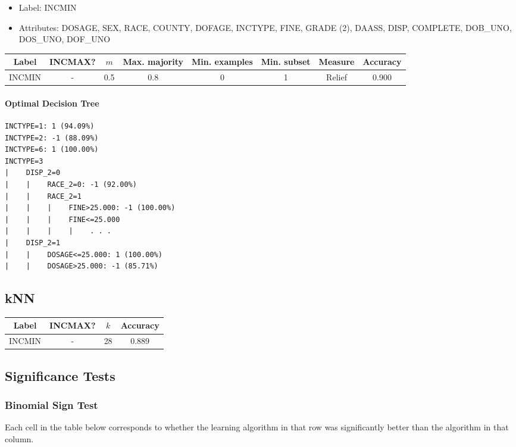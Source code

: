 \documentclass[]{article}
\begin{document}
\begin{itemize}
	\item Label: INCMIN
	\item Attributes: DOSAGE, SEX, RACE, COUNTY, DOFAGE, INCTYPE, FINE, GRADE (2), DAASS, DISP, COMPLETE, DOB\_UNO, DOS\_UNO, DOF\_UNO
\end{itemize}

\begin{tabular}{|c|c|c|c|c|c|c|c|}
\hline
Label & INCMAX? & $m$ & Max. majority & Min. examples & Min. subset & Measure & Accuracy \\
\hline
INCMIN & - & 0.5 & 0.8 & 0 & 1 & Relief & 0.900 \\
\hline
\end{tabular}

\paragraph{Optimal Decision Tree} %
\begin{verbatim}
INCTYPE=1: 1 (94.09%)
INCTYPE=2: -1 (88.09%)
INCTYPE=6: 1 (100.00%)
INCTYPE=3
|    DISP_2=0
|    |    RACE_2=0: -1 (92.00%)
|    |    RACE_2=1
|    |    |    FINE>25.000: -1 (100.00%)
|    |    |    FINE<=25.000
|    |    |    |    . . .
|    DISP_2=1
|    |    DOSAGE<=25.000: 1 (100.00%)
|    |    DOSAGE>25.000: -1 (85.71%)
\end{verbatim}

\subsection{kNN}
\begin{tabular}{|c|c|c|c|}
\hline
Label & INCMAX? & $k$ & Accuracy \\
\hline
INCMIN & - & 28 & 0.889 \\
\hline
\end{tabular}


\subsection{Significance Tests}

\subsubsection{Binomial Sign Test}
Each cell in the table below corresponds to whether the learning algorithm in that row was significantly better than the algorithm in that column.
\end{document}
